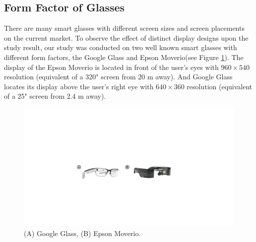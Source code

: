 \documentclass{sigchi}
\begin{document}
\subsection {Form Factor of Glasses}
  There are many smart glasses with different screen sizes and screen placements on the current market. To observe the effect of distinct display designs upon the study result, our study was conducted on two well known smart glasses with different form factors, the Google Glass and Epson Moverio(see Figure \ref{fig:Glasses}). The display of the Epson Moverio is located in front of the user's eyes with $960 \times 540$ resolution (equivalent of a 320" screen from 20 m away)\cite{BT100}. And Google Glass locates its display above the user's right eye with $640 \times 360$ resolution (equivalent of a 25" screen from 2.4 m away)\cite{GoogleGlass}.  

  \begin{figure}[!h]
  \centering
  \includegraphics[width=1\columnwidth]{Glasses.pdf}
  \caption{(A) Google Glass, (B) Epson Moverio.}
  \label{fig:Glasses}
  \end{figure}  
\end{document}
